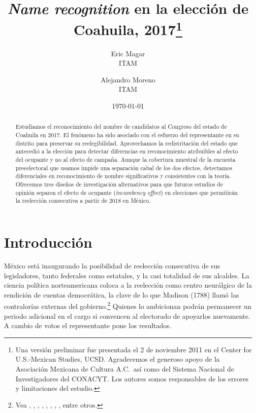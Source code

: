 \documentclass[letter,12pt]{article}
\begin{document}
\title{\emph{Name recognition} en la elección de Coahuila, 2017\thanks{Una versión preliminar fue presentada el 2 de noviembre 2011 en el Center for U.S.-Mexican Studies, UCSD. Agradecemos el generoso apoyo de la Asociación Mexicana de Cultura A.C.\ así como del Sistema Nacional de Investigadores del CONACYT. Los autores somos responsables de los errores y limitaciones del estudio.}}
\author{Eric Magar  \\ ITAM \and
        Alejandro Moreno \\ ITAM 
}
\date{\today}
\maketitle


\begin{abstract}
\noindent Estudiamos el reconocimiento del nombre de candidatos al Congreso del estado de Coahuila en 2017. El fenómeno ha sido asociado con el esfuerzo del representante en su distrito para preservar su reelegibilidad. Aprovechamos la redistritación del estado que antecedió a la elección para detectar diferencias en reconocimiento atribuibles al efecto del ocupante y no al efecto de campaña. Aunque la cobertura muestral de la encuesta preeelectoral que usamos impide una separación cabal de los dos efectos, detectamos diferenciales en reconocimiento de nombre significativos y consistentes con la teoría. Ofrecemos tres diseños de investigación alternativos para que futuros estudios de opinión separen el efecto de ocupante (\emph{incumbency effect}) en elecciones que permitirán la reelección consecutiva a partir de 2018 en México. 
\end{abstract}


\onehalfspacing

\section{Introducción}

\noindent México está inaugurando la posibilidad de reelección consecutiva de sus legisladores, tanto federales como estatales, y la casi totalidad de sus alcaldes. La ciencia política norteamericana coloca a la reelección como centro neurálgico de la rendición de cuentas democrática, la clave de lo que Madison (1788)\nocite{madison.51.esp} llamó las contralorías externas del gobierno.\footnote{Vea \citet{schlesinger.1966}, \citet{mayhew.1974}, \citet{fenno.1978}, \citet{cain.etal.1987}, \citet{mccubbins.sullivan.1987}, \citet{cox.mccubbins.1993}, \citet{weingast.marshall.1988}, \citet{jacobson.1997}, entre otros.} Quienes lo ambicionan podrán permanecer un periodo adicional en el cargo si convencen al electorado de apoyarlos nuevamente. A cambio de votos el representante pone los resultados. 
\end{document}
